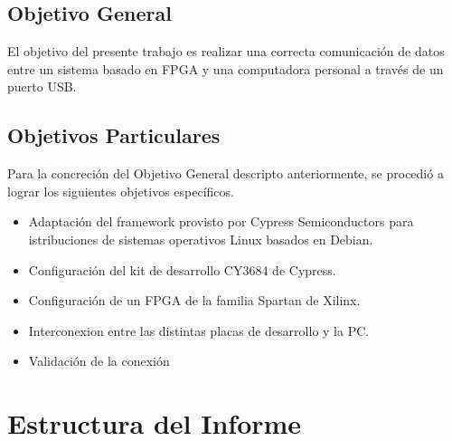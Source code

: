     \subsection{Objetivo General}

    El objetivo del presente trabajo es realizar una correcta comunicación de
    datos entre un sistema basado en FPGA y una computadora personal a través de
    un puerto USB.

    \subsection{Objetivos Particulares}

    Para la concreción del Objetivo General descripto anteriormente, se procedió
    a lograr los siguientes objetivos específicos.

      \begin{itemize}
        \item Adaptación del framework provisto por Cypress Semiconductors para
        istribuciones de sistemas operativos Linux basados en Debian.
        \item Configuración del kit de desarrollo CY3684 de Cypress.
        \item Configuración de un FPGA de la familia Spartan de Xilinx.
        \item Interconexion entre las distintas placas de desarrollo y la PC.
        \item Validación de la conexión
      \end{itemize}

  \section{Estructura del Informe}
